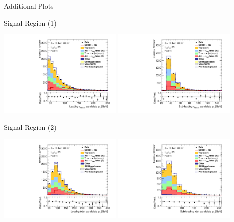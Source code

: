 \documentclass[11pt, xcolor={dvipsnames}, aspectratio=169, notes]{beamer}
\begin{document}

\begin{frame}[standout]
  Additional Plots
\end{frame}


\begin{frame}{Signal Region (1)}
  \centering

  \includegraphics[width=0.45\textwidth]{sr_postfit/Region_BMin0_incJet1_distTau0Pt_J2_Y2015_DLLOS_T2_SpcTauHH_L0_GlobalFit_conditionnal_mu0}%
  \hfill%
  \includegraphics[width=0.45\textwidth]{sr_postfit/Region_BMin0_incJet1_distTau1Pt_J2_Y2015_DLLOS_T2_SpcTauHH_L0_GlobalFit_conditionnal_mu0}
\end{frame}


\begin{frame}{Signal Region (2)}
  \centering

  \includegraphics[width=0.45\textwidth]{sr_postfit/Region_BMin0_incJet1_distpTB0_J2_Y2015_DLLOS_T2_SpcTauHH_L0_GlobalFit_conditionnal_mu0}%
  \hfill%
  \includegraphics[width=0.45\textwidth]{sr_postfit/Region_BMin0_incJet1_distpTB1_J2_Y2015_DLLOS_T2_SpcTauHH_L0_GlobalFit_conditionnal_mu0}
\end{frame}
\end{document}
